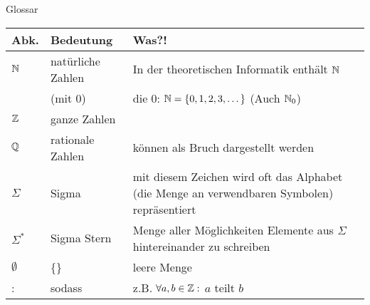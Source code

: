 \begin{frame}[fragile]{Glossar}
	\small
	\begin{tabular}{p{} p{} p{}}
		\toprule
		Abk.&Bedeutung&Was?!\\
		\midrule
		$\mathbb{N}$&natürliche Zahlen&In der theoretischen Informatik enthält $\mathbb{N}$ \\ 
		&(mit 0)&die 0: $\mathbb{N}=\{0,1,2,3,\dots\}$ (Auch $\mathbb{N}_0$)\\
		$\mathbb{Z}$&ganze Zahlen&\\
		$\mathbb{Q}$&rationale Zahlen&können als Bruch dargestellt werden\\
		$\Sigma$ & Sigma& mit diesem Zeichen wird oft das Alphabet (die Menge an verwendbaren Symbolen) repräsentiert\\
		$\Sigma^\ast$&Sigma Stern&Menge aller Möglichkeiten Elemente aus $\Sigma$ hintereinander zu schreiben\\
		$\emptyset$&\{\}&leere Menge\\
		:&sodass&z.B. $\forall a,b\in\mathbb{Z}:$ $a$ teilt $b$\\
		\bottomrule
	\end{tabular}
\end{frame}